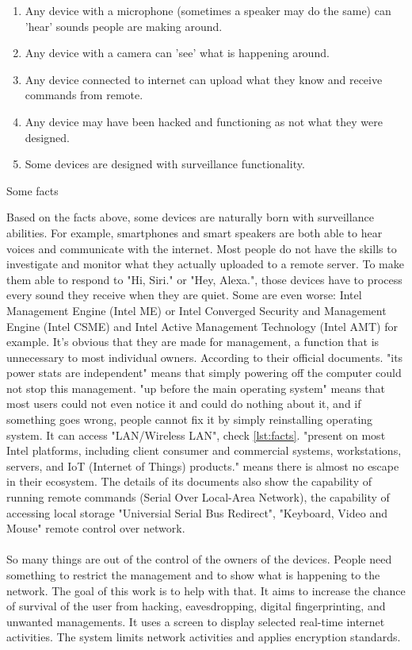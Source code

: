 \documentclass[mscthesis]{usiinfthesis}
\begin{document}
\begin{table}[H]
  \begin{enumerate}
    \item Any device with a microphone (sometimes a speaker may do the same) can 'hear' sounds people are making around.
    \item Any device with a camera can 'see' what is happening around.
    \item Any device connected to internet can upload what they know and receive commands from remote.
    \item Any device may have been hacked and functioning as not what they were designed.
    \item Some devices are designed with surveillance functionality.
  \end{enumerate}
  \caption{Some facts}
  \label{lst:facts}
\end{table}
Based on the facts above, some devices are naturally born with surveillance abilities. For example, smartphones and smart speakers are both able to hear voices and communicate with the internet. Most people do not have the skills to investigate and monitor what they actually uploaded to a remote server. To make them able to respond to "Hi, Siri." or "Hey, Alexa.", those devices have to process every sound they receive when they are quiet. Some are even worse: Intel Management Engine (Intel ME) or Intel Converged Security and Management Engine (Intel CSME) and Intel Active Management Technology (Intel AMT) for example. It's obvious that they are made for management, a function that is unnecessary to most individual owners. According to their official documents. "its power stats are independent" means that simply powering off the computer could not stop this management. "up before the main operating system" means that most users could not even notice it and could do nothing about it, and if something goes wrong, people cannot fix it by simply reinstalling operating system. It can access "LAN/Wireless LAN", check \cref{lst:facts}. "present on most Intel platforms, including client consumer and commercial systems, workstations, servers, and IoT (Internet of Things) products." means there is almost no escape in their ecosystem. The details of its documents also show the capability of running remote commands (Serial Over Local-Area Network), the capability of accessing local storage "Universial Serial Bus Redirect", "Keyboard, Video and Mouse" remote control over network.
\paragraph{}
So many things are out of the control of the owners of the devices. People need something to restrict the management and to show what is happening to the network. The goal of this work is to help with that. It aims to increase the chance of survival of the user from hacking, eavesdropping, digital fingerprinting, and unwanted managements. It uses a screen to display selected real-time internet activities. The system limits network activities and applies encryption standards.
\end{document}
